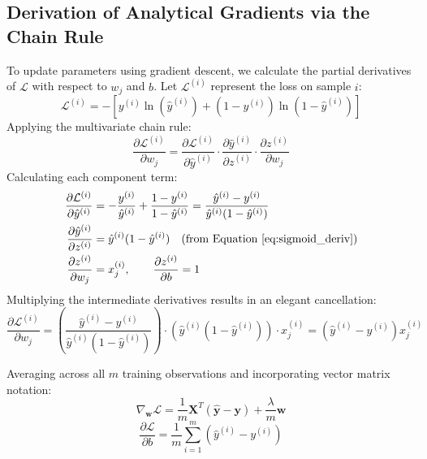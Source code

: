 \documentclass[11pt,a4paper]{article}
\begin{document}
\subsection{Derivation of Analytical Gradients via the Chain Rule}
To update parameters using gradient descent, we calculate the partial derivatives of $\mathcal{L}$ with respect to $w_j$ and $b$. Let $\mathcal{L}^{(i)}$ represent the loss on sample $i$:
\begin{equation}
    \mathcal{L}^{(i)} = -\left[ y^{(i)} \ln(\hat{y}^{(i)}) + (1 - y^{(i)}) \ln(1 - \hat{y}^{(i)}) \right]
\end{equation}
Applying the multivariate chain rule:
\begin{equation}
    \frac{\partial \mathcal{L}^{(i)}}{\partial w_j} = \frac{\partial \mathcal{L}^{(i)}}{\partial \hat{y}^{(i)}} \cdot \frac{\partial \hat{y}^{(i)}}{\partial z^{(i)}} \cdot \frac{\partial z^{(i)}}{\partial w_j}
\end{equation}
Calculating each component term:
\begin{align}
    \frac{\partial \mathcal{L}^{(i)}}{\partial \hat{y}^{(i)}} &= -\frac{y^{(i)}}{\hat{y}^{(i)}} + \frac{1 - y^{(i)}}{1 - \hat{y}^{(i)}} = \frac{\hat{y}^{(i)} - y^{(i)}}{\hat{y}^{(i)}(1 - \hat{y}^{(i)})} \\
    \frac{\partial \hat{y}^{(i)}}{\partial z^{(i)}} &= \hat{y}^{(i)}(1 - \hat{y}^{(i)}) \quad \text{(from Equation~\ref{eq:sigmoid_deriv})} \\
    \frac{\partial z^{(i)}}{\partial w_j} &= x_j^{(i)}, \qquad \frac{\partial z^{(i)}}{\partial b} = 1
\end{align}
Multiplying the intermediate derivatives results in an elegant cancellation:
\begin{equation}
    \frac{\partial \mathcal{L}^{(i)}}{\partial w_j} = \left(\frac{\hat{y}^{(i)} - y^{(i)}}{\hat{y}^{(i)}(1 - \hat{y}^{(i)})}\right) \cdot \left(\hat{y}^{(i)}(1 - \hat{y}^{(i)})\right) \cdot x_j^{(i)} = (\hat{y}^{(i)} - y^{(i)}) x_j^{(i)}
\end{equation}

Averaging across all $m$ training observations and incorporating vector matrix notation:
\begin{equation}
    \nabla_{\mathbf{w}} \mathcal{L} = \frac{1}{m} \mathbf{X}^T (\hat{\mathbf{y}} - \mathbf{y}) + \frac{\lambda}{m} \mathbf{w}
    \label{eq:grad_w}
\end{equation}
\begin{equation}
    \frac{\partial \mathcal{L}}{\partial b} = \frac{1}{m} \sum_{i=1}^m (\hat{y}^{(i)} - y^{(i)})
    \label{eq:grad_b}
\end{equation}
\end{document}
